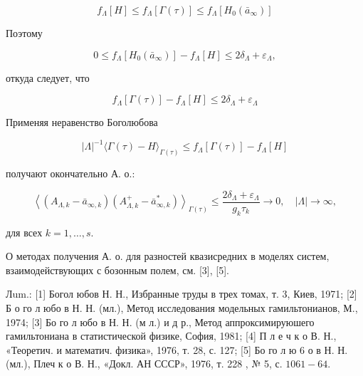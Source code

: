\documentclass[10pt]{article}
\begin{document}
\[

f_{\Lambda}[H] \leqslant f_{\Lambda}[\Gamma(\tau)] \leqslant f_{\Lambda}\left[H_{0}\left(\bar{a}_{\infty}\right)\right]

\]



Поэтому



\[

0 \leqslant f_{\Lambda}\left[H_{0}\left(\bar{a}_{\infty}\right)\right]-f_{\Lambda}[H] \leqslant 2 \delta_{\Lambda}+\varepsilon_{\Lambda},

\]



откуда следует, что



\[

f_{\Lambda}[\Gamma(\tau)]-f_{\Lambda}[H] \leqslant 2 \delta_{\Lambda}+\varepsilon_{\Lambda}

\]



Применяя неравенство Боголюбова



\[

|\Lambda|^{-1}\langle\Gamma(\tau)-H\rangle_{\Gamma(\tau)} \leqslant f_{\Lambda}[\Gamma(\tau)]-f_{\Lambda}[H]

\]



получают окончательно А. о.:



\[

\left\langle\left(A_{\Lambda, k}-\bar{a}_{\infty, k}\right)\left(A_{\Lambda, k}^{+}-\bar{a}_{\infty, k}^{*}\right)\right\rangle_{\Gamma(\tau)} \leqslant \frac{2 \delta_{\Lambda}+\varepsilon_{\Lambda}}{g_{k} \tau_{k}} \rightarrow 0, \quad|\Lambda| \rightarrow \infty,

\]



для всех $k=1, \ldots, s$.



О методах получения А. о. для разностей квазисредних в моделях систем, взаимодействующих с бозонным полем, см. [3], [5].



Лum.: [1] Богол юбов Н. Н., Избранные труды в трех томах, т. 3, Киев, 1971; [2] Б о го л юбо в Н. Н. (мл.), Метод исследования модельных гамильтонианов, М., 1974; [3] Бо го л юбо в Н. Н. (м л.) и д р., Метод аппроксимируюшего гамильтониана в статистической физике, София, 1981; [4] П л е ч к о В. Н., «Теоретич. и математич. физика», 1976, т. 28, с. 127; [5] Бо го л ю 6 о в Н. Н. (мл.), Плеч к о В. Н., «Докл. АН СССР», 1976, т. 228 , № 5, с. $1061-64$.
\end{document}
